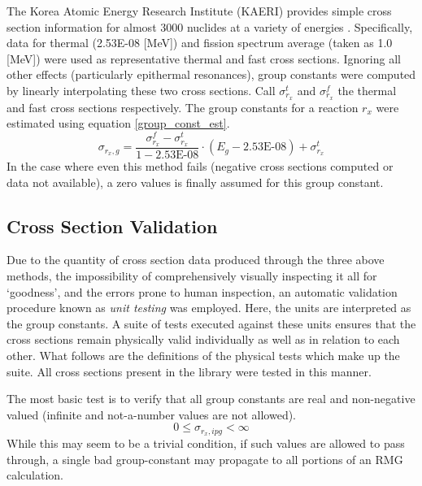 The Korea Atomic Energy Research Institute (KAERI) provides simple cross section information
for almost 3000 nuclides at a variety of energies \cite{KAER2000}.  Specifically, data for
thermal (2.53E-08 [MeV]) and fission spectrum average (taken as 1.0 [MeV]) were used as representative
thermal and fast cross sections.  Ignoring all other effects (particularly epithermal resonances), 
group constants were computed by linearly interpolating these two cross sections.  Call 
$\sigma_{r_x}^t$ and $\sigma_{r_x}^f$ the thermal and fast cross sections respectively.  The group
constants for a reaction $r_x$ were estimated using equation \ref{group_const_est}.
\begin{equation}
\label{group_const_est}
\sigma_{r_x,g} = \frac{\sigma_{r_x}^f - \sigma_{r_x}^t}{1 - \mbox{2.53E-08}} \cdot (E_g - \mbox{2.53E-08}) + \sigma_{r_x}^t
\end{equation}
In the case where even this method fails (negative cross sections computed or data not available), 
a zero values is finally assumed for this group constant.

\subsection{Cross Section Validation}
\label{mg:xs_validation}
Due to the quantity of cross section data produced through the three above methods, the 
impossibility of comprehensively visually inspecting it all for `goodness', and the errors 
prone to human inspection, an automatic validation procedure known as \emph{unit testing}
was employed.  Here, the units are interpreted as the group constants.   A suite of tests 
executed against these units ensures that the cross sections remain physically valid 
individually as well as in relation to each other. What follows are the definitions of the 
physical tests which make up the suite.  All cross sections present in the library were tested 
in this manner.

The most basic test is to verify that all group constants are real and non-negative valued 
(infinite and not-a-number values are not allowed).  
\begin{equation}
\label{nn_ut}
0 \le \sigma_{r_x,ipg} < \infty
\end{equation}
While this may seem to be a trivial 
condition, if such values are allowed to pass through, a single bad group-constant may 
propagate to all portions of an RMG calculation.

